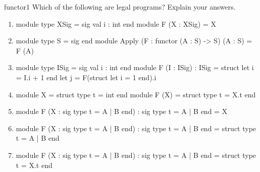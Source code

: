 %
%
%
\exercises

%
\begin{exercise}{functor1}
Which of the following are legal programs?  Explain your answers.

\begin{enumerate}
\item

\begin{ocamllisting}
module type XSig = sig val i : int end
module F (X : XSig) = X
\end{ocamllisting}

\item

\begin{ocamllisting}
module type S = sig end
module Apply (F : functor (A : S) -> S) (A : S) = F (A)
\end{ocamllisting}

\item

\begin{ocamllisting}
module type ISig = sig val i : int end
module F (I : ISig) : ISig = struct let i = I.i + 1 end
let j = F(struct let i = 1 end).i
\end{ocamllisting}

\item

\begin{ocamllisting}
module X = struct type t = int end
module F (X) = struct type t = X.t end
\end{ocamllisting}

\item

\begin{ocamllisting}
module F (X : sig type t = A | B end) : sig type t = A | B end = X
\end{ocamllisting}

\item

\begin{ocamllisting}
module F (X : sig type t = A | B end) : sig type t = A | B end =
struct type t = A | B end
\end{ocamllisting}

\item

\begin{ocamllisting}
module F (X : sig type t = A | B end) : sig type t = A | B end =
struct type t = X.t end
\end{ocamllisting}


\end{enumerate}
\end{exercise}
